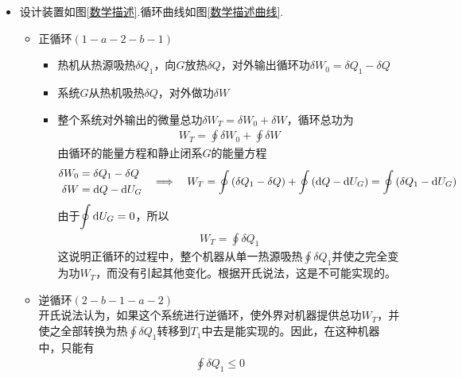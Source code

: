 \begin{itemize}
	\item 设计装置如图\ref{数学描述}.循环曲线如图\ref{数学描述曲线}.\vspace*{-0.5em}
\begin{itemize}
	\item 正循环$(1-a-2-b-1)$
	\begin{itemize}
		\item 热机从热源吸热$\delta Q_1$，向$G$放热$\delta Q$，对外输出循环功$\delta W_0 = \delta Q_1 - \delta Q$
		\item 系统$G$从热机吸热$\delta Q$，对外做功$\delta W$
		\item 整个系统对外输出的微量总功$\delta W_T = \delta W_0 + \delta W$，循环总功为
		\begin{align}
			W_T = \oint \delta W_0 + \oint \delta W
		\end{align}
	由循环的能量方程和静止闭系$G$的能量方程
	\begin{align}
		\begin{aligned}
			\delta W_0 &= \delta Q_1 - \delta Q \\
			\delta W &= {\rm{d}} Q - {\rm{d}} U_G 
		\end{aligned}
	\quad \Longrightarrow \quad
	W_T = \oint \left(\delta Q_1 - \delta Q\right) + \oint \left({\rm{d}} Q - {\rm{d}} U_G \right) = \oint \left(\delta Q_1 - {\rm{d}} U_G\right) 
	\end{align}
由于$\displaystyle \oint {\rm{d}} U_G = 0$，所以
\begin{align}
	W_T = \oint \delta Q_1
\end{align}
这说明正循环的过程中，整个机器从单一热源吸热$\displaystyle \oint \delta Q_1$并使之完全变为功$W_T$，而没有引起其他变化。根据开氏说法，这是不可能实现的。
	\end{itemize}
	\item 逆循环$(2-b-1-a-2)$\\	
		\hspace*{2em} 开氏说法认为，如果这个系统进行逆循环，使外界对机器提供总功$W_T$，并使之全部转换为热$\oint \delta Q_1$转移到$T_1$中去是能实现的。因此，在这种机器中，只能有
		\begin{align}
			\oint \delta Q_1 \le 0
		\end{align}
\end{itemize}	
\end{itemize}

